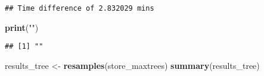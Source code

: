 \documentclass[
]{article}
\newenvironment{Shaded}{\begin{snugshade}}{\end{snugshade}}
\newcommand{\KeywordTok}[1]{\textcolor[rgb]{0.13,0.29,0.53}{\textbf{#1}}}
\newcommand{\NormalTok}[1]{#1}
\newcommand{\StringTok}[1]{\textcolor[rgb]{0.31,0.60,0.02}{#1}}
\begin{document}
\begin{verbatim}
## Time difference of 2.832029 mins
\end{verbatim}

\begin{Shaded}
\begin{Highlighting}[]
\KeywordTok{print}\NormalTok{(}\StringTok{""}\NormalTok{)                                                          }
\end{Highlighting}
\end{Shaded}

\begin{verbatim}
## [1] ""
\end{verbatim}

\begin{Shaded}
\begin{Highlighting}[]
\NormalTok{results_tree <-}\StringTok{ }\KeywordTok{resamples}\NormalTok{(store_maxtrees)}
\KeywordTok{summary}\NormalTok{(results_tree)}
\end{Highlighting}
\end{Shaded}
\end{document}
